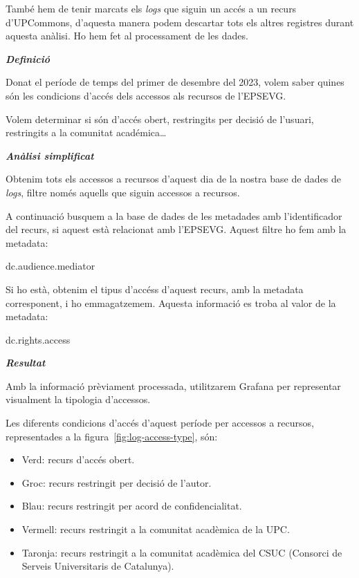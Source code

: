 \documentclass[lettersize,journal]{IEEEtran}
\begin{document}
També hem de tenir marcats els \textit{logs} que siguin un accés a un recurs d'UPCommons, d'aquesta manera podem descartar tots els altres registres durant aquesta anàlisi.
Ho hem fet al processament de les dades.

\textit{\textbf{Definició}}

Donat el període de temps del primer de desembre del 2023, volem saber quines són les condicions d'accés dels accessos als recursos de l'EPSEVG.

Volem determinar si són d'accés obert, restringits per decisió de l'usuari, restringits a la comunitat académica\dots

\textit{\textbf{Anàlisi simplificat}}

Obtenim tots els accessos a recursos d'aquest dia de la nostra base de dades de \textit{logs}, filtre només aquells que siguin accessos a recursos.

A continuació busquem a la base de dades de les metadades amb l'identificador del recurs, si aquest està relacionat amb l'EPSEVG.
Aquest filtre ho fem amb la metadata:
\begin{center}
    {dc.audience.mediator}
\end{center}

Si ho està, obtenim el tipus d'accéss d'aquest recurs, amb la metadata corresponent, i ho emmagatzemem.
Aquesta informació es troba al valor de la metadata:
\begin{center}
    {dc.rights.access}
\end{center}

\textit{\textbf{Resultat}}

Amb la informació prèviament processada, utilitzarem Grafana per representar visualment la tipologia d'accessos.

Les diferents condicions d'accés d'aquest període per accessos a recursos, representades a la figura~\ref{fig:log-access-type}, són:
\begin{itemize}
    \item Verd: recurs d'accés obert.
    \item Groc: recurs restringit per decisió de l'autor.
    \item Blau: recurs restringit per acord de confidencialitat.
    \item Vermell: recurs restringit a la comunitat acadèmica de la UPC.
    \item Taronja: recurs restringit a la comunitat acadèmica del CSUC (Consorci de Serveis Universitaris de Catalunya).
\end{itemize}
\end{document}
